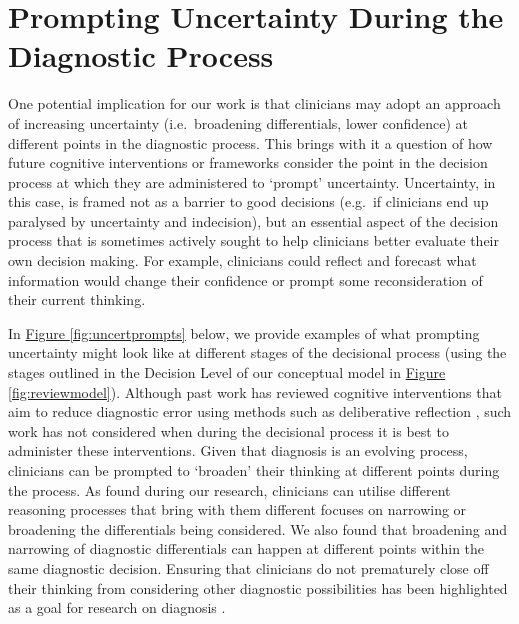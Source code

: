 \documentclass[a4paper, nobind]{templates/ociamthesis}
\begin{document}
\section{Prompting Uncertainty During the Diagnostic Process}\label{prompting-uncertainty-during-the-diagnostic-process}

One potential implication for our work is that clinicians may adopt an approach of increasing uncertainty (i.e.~broadening differentials, lower confidence) at different points in the diagnostic process. This brings with it a question of how future cognitive interventions or frameworks consider the point in the decision process at which they are administered to `prompt' uncertainty. Uncertainty, in this case, is framed not as a barrier to good decisions (e.g.~if clinicians end up paralysed by uncertainty and indecision), but an essential aspect of the decision process that is sometimes actively sought to help clinicians better evaluate their own decision making. For example, clinicians could reflect and forecast what information would change their confidence or prompt some reconsideration of their current thinking.

In \hyperref[fig:uncertprompts]{Figure \ref{fig:uncertprompts}} below, we provide examples of what prompting uncertainty might look like at different stages of the decisional process (using the stages outlined in the Decision Level of our conceptual model in \hyperref[fig:reviewmodel]{Figure \ref{fig:reviewmodel}}). Although past work has reviewed cognitive interventions that aim to reduce diagnostic error \autocite{graber_cognitive_2012,lambe_dual-process_2016,dave_interventions_2022} using methods such as deliberative reflection \autocite{norman_etiology_2014,lambe_guided_2018,costa_filho_effects_2019,kuhn_learning_2023}, such work has not considered when during the decisional process it is best to administer these interventions. Given that diagnosis is an evolving process, clinicians can be prompted to `broaden' their thinking at different points during the process. As found during our research, clinicians can utilise different reasoning processes that bring with them different focuses on narrowing or broadening the differentials being considered. We also found that broadening and narrowing of diagnostic differentials can happen at different points within the same diagnostic decision. Ensuring that clinicians do not prematurely close off their thinking from considering other diagnostic possibilities has been highlighted as a goal for research on diagnosis \autocite{krupat_avoiding_2017}.
\end{document}
